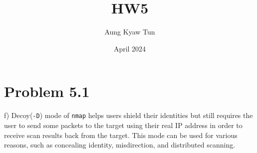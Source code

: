 \documentclass{article}
\title{HW5}
\author{Aung Kyaw Tun }
\date{April 2024}
\begin{document}
\maketitle

\section{Problem 5.1}

f) Decoy(\texttt{-D}) mode of \texttt{nmap} helps users shield their identities but still requires the user to send some packets to the target using their real IP address in order to receive scan results back from the target. This mode can be used for various reasons, such as concealing identity, misdirection, and distributed scanning. 
\end{document}
